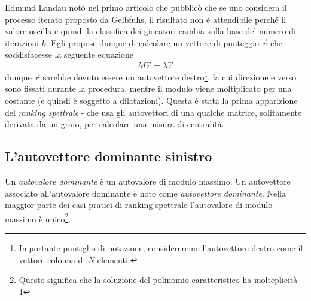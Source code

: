 Edmund Landau \cite{landau} notò nel primo articolo che pubblicò \cite{landaus} che se uno considera il processo iterato proposto da Gelbfuhs, il risultato non è attendibile perché il valore oscilla e quindi la classifica dei giocatori cambia sulla base del numero di iterazioni $k$. Egli propose dunque di calcolare un vettore di punteggio $\vec{r}$ che soddisfacesse la seguente equazione
\begin{equation}
	M\vec{r} = \lambda \vec{r}
\end{equation}
dunque $\vec{r}$ sarebbe dovuto essere un autovettore destro\footnote{Importante puntiglio di
	notazione, considereremo l'autovettore destro come il vettore colonna di $N$ elementi.}, la cui direzione e verso sono fissati durante la procedura, mentre il modulo viene moltiplicato per una costante (e quindi è soggetto a dilatazioni). Questa è stata la prima apparizione del \textit{ranking spettrale} - che usa gli autovettori di una qualche matrice, solitamente derivata da un grafo, per calcolare una misura di centralità.
\subsection{L'autovettore dominante sinistro}
Un \textit{autovalore dominante} è un autovalore di modulo massimo. Un autovettore associato all'autovalore dominante è noto come \textit{autovettore dominante}. Nella maggior parte dei casi pratici di ranking spettrale l'autovalore di modulo massimo è unico\footnote{Questo significa che la soluzione del polinomio caratteristico ha molteplicità 1}.

